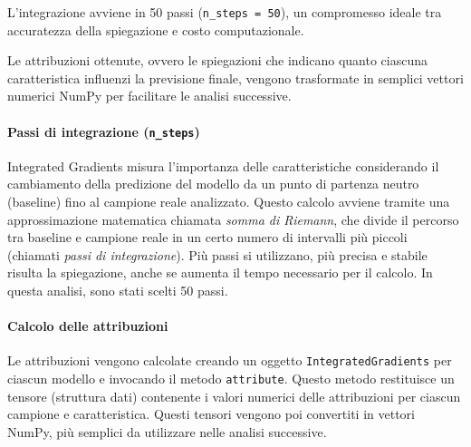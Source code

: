 \documentclass[a4paper,11pt]{article}
\begin{document}
L'integrazione avviene in 50 passi (\texttt{n\_steps = 50}), un compromesso ideale tra accuratezza della spiegazione e costo computazionale.

Le attribuzioni ottenute, ovvero le spiegazioni che indicano quanto ciascuna caratteristica influenzi la previsione finale, vengono trasformate in semplici vettori numerici NumPy per facilitare le analisi successive.

\paragraph{Passi di integrazione (\texttt{n\_steps})}
Integrated Gradients misura l'importanza delle caratteristiche considerando il cambiamento della predizione del modello da un punto di partenza neutro (baseline) fino al campione reale analizzato. Questo calcolo avviene tramite una approssimazione matematica chiamata \emph{somma di Riemann}, che divide il percorso tra baseline e campione reale in un certo numero di intervalli più piccoli (chiamati \emph{passi di integrazione}). Più passi si utilizzano, più precisa e stabile risulta la spiegazione, anche se aumenta il tempo necessario per il calcolo. In questa analisi, sono stati scelti 50 passi.

\paragraph{Calcolo delle attribuzioni}
Le attribuzioni vengono calcolate creando un oggetto \texttt{IntegratedGradients} per ciascun modello e invocando il metodo \texttt{attribute}. Questo metodo restituisce un tensore (struttura dati) contenente i valori numerici delle attribuzioni per ciascun campione e caratteristica. Questi tensori vengono poi convertiti in vettori NumPy, più semplici da utilizzare nelle analisi successive.
\end{document}

